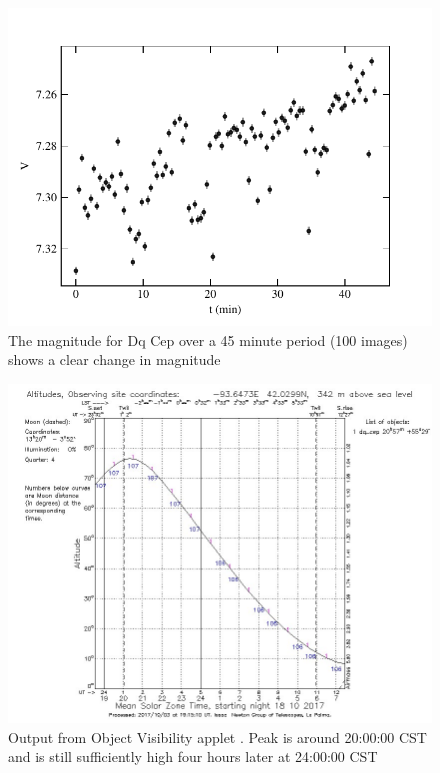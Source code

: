 \documentclass[]{article}
\begin{document}
\begin{figure}[H]
	\includegraphics[width=\linewidth]{figs/mags.pdf}
	\caption{The magnitude for Dq Cep over a 45 minute period (100 images) shows a clear change in magnitude}
	\label{fig:mags}
\end{figure}
\begin{figure}[H]
	\includegraphics[width=\linewidth]{figs/staralt.png}
	\caption{Output from \textcite{staralt} Object Visibility applet . Peak is around 20:00:00 CST and is still sufficiently high four hours later at 24:00:00 CST}
	\label{fig:staralt}
\end{figure}
\end{document}
